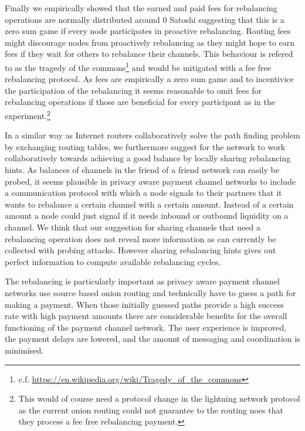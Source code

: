 \documentclass[a4paper]{paper}
\begin{document}
Finally we empirically showed that the earned and paid fees for rebalancing operations are normally distributed around $0$ Satoshi suggesting that this is a zero sum game if every node participates in proactive rebalancing.
Routing fees might discourage nodes from proactively rebalancing as they might hope to earn fees if they wait for others to rebalance their channels.
This behaviour is refered to as the tragedy of the commons\footnote{c.f. \url{https://en.wikipedia.org/wiki/Tragedy_of_the_commons}} and would be mitigated with a fee free rebalancing protocol.
As fees are empirically a zero sum game and to incentivice the participation of the rebalancing it seems reasonable to omit fees for rebalancing operations if those are beneficial for every participant as in the experiment.\footnote{This would of course need a protocol change in the lightning network protocol as the current onion routing could not guarantee to the routing noes that they process a fee free rebalancing payment.}

In a similar way as Internet routers collaboratively solve the path finding problem by exchanging routing tables, we furthermore suggest for the network to work collaboratively towards achieving a good balance by locally sharing rebalancing hints. 
As balances of channels in the friend of a friend network can easily be probed, it seems plausible in privacy aware payment channel networks to include a communication protocol with which a node signals to their partners that it wants to rebalance a certain channel with a certain amount.
Instead of a certain amount a node could just signal if it needs inbound or outbound liquidity on a channel. 
We think that our suggestion for sharing channels that need a rebalancing operation does not reveal more information as can currently be collected with probing attacks.
However sharing rebalancing hints gives out perfect information to compute available rebalancing cycles.

The rebalancing is particularly important as privacy aware payment channel networks use source based onion routing and technically have to guess a path for making a payment.
When those initially guessed paths provide a high success rate with high payment amounts there are considerable benefits for the overall functioning of the payment channel network. 
The user experience is improved, the payment delays are lowered, and the amount of messaging and coordination is minimised.

\end{document}
